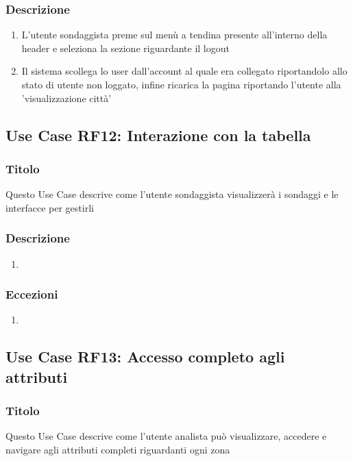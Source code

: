         \subsubsection{Descrizione}
            \begin{enumerate}
                \item L'utente sondaggista preme sul menù a tendina presente all'interno della header e seleziona la sezione riguardante il logout
                \item Il sistema scollega lo user dall'account al quale era collegato riportandolo allo stato di utente non loggato, infine 
                ricarica la pagina riportando l'utente alla 'visualizzazione città'
            \end{enumerate}

    \subsection{Use Case RF12: Interazione con la tabella}
        \subsubsection{Titolo}
            Questo Use Case descrive come l'utente sondaggista visualizzerà i sondaggi e le interfacce per gestirli
        \subsubsection{Descrizione}
            \begin{enumerate}
                \item 
            \end{enumerate}
        \subsubsection{Eccezioni}
            \begin{enumerate}
                \item
            \end{enumerate}

    \subsection{Use Case RF13: Accesso completo agli attributi}
        \subsubsection{Titolo}
            Questo Use Case descrive come l'utente analista può visualizzare, accedere e navigare agli attributi completi riguardanti ogni zona
